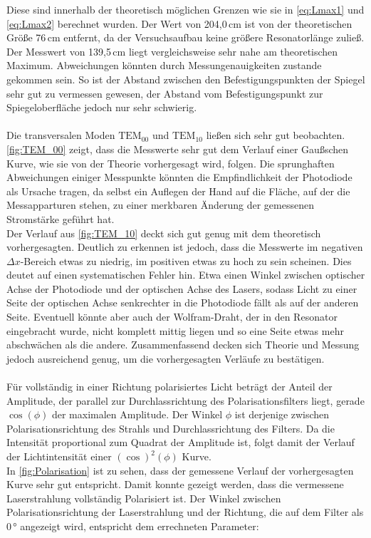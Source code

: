 Diese sind innerhalb der theoretisch möglichen Grenzen wie sie in \autoref{eq:Lmax1} und \autoref{eq:Lmax2} berechnet wurden. 
Der Wert von 204,0\,cm ist von der theoretischen Größe 76\,cm entfernt, da der Versuchsaufbau keine größere Resonatorlänge zuließ.
Der Messwert von 139,5\,cm liegt vergleichsweise sehr nahe am theoretischen Maximum. Abweichungen könnten durch Messungenauigkeiten zustande gekommen sein. So ist der Abstand zwischen den Befestigungspunkten der Spiegel sehr gut zu vermessen gewesen, der Abstand vom Befestigungspunkt zur Spiegeloberfläche jedoch nur sehr schwierig.\\
\\
Die transversalen Moden $\text{TEM}_{00}$ und $\text{TEM}_{10}$ ließen sich sehr gut beobachten.
\autoref{fig:TEM_00} zeigt, dass die Messwerte sehr gut dem Verlauf einer Gaußschen Kurve, wie sie von der Theorie vorhergesagt wird, folgen. Die sprunghaften Abweichungen einiger Messpunkte könnten die Empfindlichkeit der Photodiode als Ursache tragen, da selbst ein Auflegen der Hand auf die Fläche, auf der die Messapparturen stehen, zu einer merkbaren Änderung der gemessenen Stromstärke geführt hat.\\
Der Verlauf aus \autoref{fig:TEM_10} deckt sich gut genug mit dem theoretisch vorhergesagten. Deutlich zu erkennen ist jedoch, dass die Messwerte im negativen $\Delta x$-Bereich etwas zu niedrig, im positiven etwas zu hoch zu sein scheinen. Dies deutet auf einen systematischen Fehler hin. Etwa einen Winkel zwischen optischer Achse der Photodiode und der optischen Achse des Lasers, sodass Licht zu einer Seite der optischen Achse senkrechter in die Photodiode fällt als auf der anderen Seite. Eventuell könnte aber auch der Wolfram-Draht, der in den Resonator eingebracht wurde, nicht komplett mittig liegen und so eine Seite etwas mehr abschwächen als die andere. Zusammenfassend decken sich Theorie und Messung jedoch ausreichend genug, um die vorhergesagten Verläufe zu bestätigen.\\
\\
Für vollständig in einer Richtung polarisiertes Licht beträgt der Anteil der Amplitude, der parallel zur Durchlassrichtung des Polarisationsfilters liegt, gerade $\cos (\phi)$ der maximalen Amplitude. Der Winkel $\phi$ ist derjenige zwischen Polarisationsrichtung des Strahls und Durchlassrichtung des Filters. Da die Intensität proportional zum Quadrat der Amplitude ist, folgt damit der Verlauf der Lichtintensität einer $(\cos)^{2}(\phi)$ Kurve.\\
In \autoref{fig:Polarisation} ist zu sehen, dass der gemessene Verlauf der vorhergesagten Kurve sehr gut entspricht.
Damit konnte gezeigt werden, dass die vermessene Laserstrahlung vollständig Polarisiert ist.
 Der Winkel zwischen Polarisationsrichtung der Laserstrahlung und der Richtung, die auf dem Filter als 0\,° angezeigt wird, entspricht dem errechneten Parameter:

